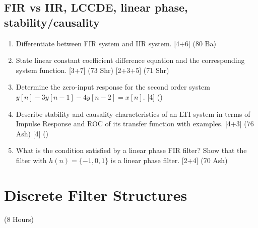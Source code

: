 \documentclass[12pt]{article}
\begin{document}
  \subsection{FIR vs IIR, LCCDE, linear phase, stability/causality}
    \begin{enumerate}[topsep=0pt, noitemsep]
      \item Differentiate between FIR system and IIR system. \hfill [4+6] (80 Ba)
      \item State linear constant coefficient difference equation and the corresponding system function. \hfill [3+7] (73 Shr) [2+3+5] (71 Shr)
      \item Determine the zero-input response for the second order system $y[n]-3y[n-1]-4y[n-2]=x[n]$. \hfill [4] ()
      \item Describe stability and causality characteristics of an LTI system in terms of Impulse Response and ROC of its transfer function with examples. \hfill [4+3] (76 Ash) [4] ()
      \item What is the condition satisfied by a linear phase FIR filter? Show that the filter with $h(n)=\{-1,0,1\}$ is a linear phase filter. \hfill [2+4] (70 Ash)
    \end{enumerate}

\pagebreak
\section{Discrete Filter Structures}
\begin{center}(8 Hours)\end{center}
\end{document}
